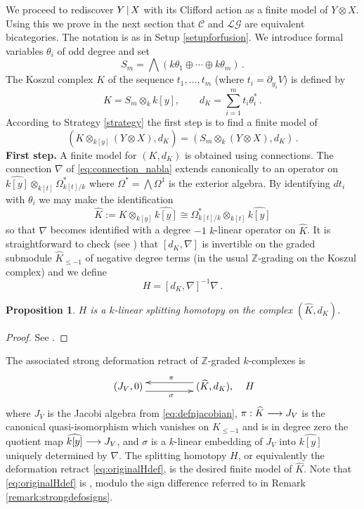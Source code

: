 \documentclass[english,letter paper,12pt,leqno]{article}
\newtheorem{proposition}[theorem]{Proposition}
\theoremstyle{example}
\numberwithin{equation}{section}
\def\LG{\mathcal{LG}}
\def\nZ{\mathds{Z}}
\def\L{\mathcal{C}}
\begin{document}
We proceed to rediscover $Y \,|\, X$ with its Clifford action as a finite model of $Y \otimes X$. Using this we prove in the next section that $\L$ and $\LG$ are equivalent bicategories. The notation is as in Setup \ref{setupforfusion}. We introduce formal variables $\theta_i$ of odd degree and set
\[
S_m = \bigwedge\left( k \theta_1 \oplus \cdots \oplus k \theta_m \right)\,.
\]
The Koszul complex $K$ of the sequence $t_1,\ldots,t_m$ (where $t_i = \partial_{y_i} V$) is defined by
\begin{equation}\label{defn:koszul2}
K = S_m \otimes_k k[y], \qquad d_K = \sum_{i=1}^m t_i \theta_i^*\,.
\end{equation}
According to Strategy \ref{strategy} the first step is to find a finite model of
\[
( K \otimes_{k[y]} ( Y \otimes X ), d_K ) = ( S_m \otimes_k ( Y \otimes X ), d_K )\,.
\]
\textbf{First step.} A finite model for $(K, d_K)$ is obtained using connections. The connection $\nabla$ of \eqref{eq:connection_nabla} extends canonically to an operator on $\widehat{k[y]} \otimes_{k[t]} \Omega^*_{k[t]/k}$ where $\Omega^* = \bigwedge \Omega^1$ is the exterior algebra. By identifying $d t_i$ with $\theta_i$ we may make the identification
\[
\widehat{K} := K \otimes_{k[y]} \widehat{k[y]} \cong \Omega^*_{k[t]/k} \otimes_{k[t]} \widehat{k[y]}
\]
so that $\nabla$ becomes identified with a degree $-1$ $k$-linear operator on $\widehat{K}$.  It is straightforward to check (see \cite[Lemma 8.7]{dm1102.2957}) that $[d_K, \nabla]$ is invertible on the graded submodule $\widehat{K}_{\le -1}$ of negative degree terms (in the usual $\nZ$-grading on the Koszul complex) and we define
\[
H = [d_K, \nabla]^{-1} \nabla\,.
\]

\begin{proposition} $H$ is a $k$-linear splitting homotopy on the complex $(\widehat{K},d_K)$.
\end{proposition}
\begin{proof}
See \cite[Section 8.1]{dm1102.2957}.
\end{proof}

The associated strong deformation retract of $\mathbb{Z}$-graded $k$-complexes is
\begin{equation}\label{eq:originalHdef}
\xymatrix@C+2pc{
(J_V,0) \ar@<-1ex>[r]_{\sigma} & (\widehat{K}, d_K), \ar@<-1ex>[l]_{\pi}
} \quad H
\end{equation}
where $J_V$ is the Jacobi algebra from \eqref{eq:defnjacobian}, $\pi: \widehat{K} \longrightarrow J_V$ is the canonical quasi-isomorphism which vanishes on $K_{\le -1}$ and is in degree zero the quotient map $\widehat{k[y]} \longrightarrow J_V$, and $\sigma$ is a $k$-linear embedding of $J_V$ into $\widehat{k[y]}$ uniquely determined by $\nabla$. The splitting homotopy $H$, or equivalently the deformation retract \eqref{eq:originalHdef}, is the desired finite model of $\widehat{K}$. Note that \eqref{eq:originalHdef} is \cite[(10.1)]{dm1102.2957}, modulo the sign difference referred to in Remark \ref{remark:strongdefosigns}.
\end{document}
